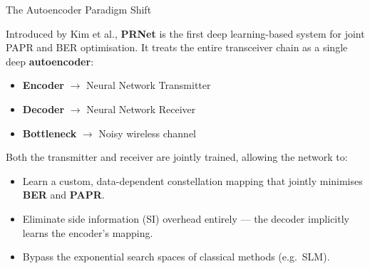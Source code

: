 \documentclass[20pt]{beamer}
\begin{document}
\begin{frame}{The Autoencoder Paradigm Shift}

    \fontsize{14}{18}\selectfont
    Introduced by Kim et al., \textbf{PRNet} is the first deep learning-based system for joint PAPR and BER optimisation. It treats the entire transceiver chain as a single deep \textbf{autoencoder}:
    \begin{itemize}
        \item \textbf{Encoder} $\longrightarrow$ Neural Network Transmitter
        \item \textbf{Decoder} $\longrightarrow$ Neural Network Receiver
        \item \textbf{Bottleneck} $\longrightarrow$ Noisy wireless channel
    \end{itemize}

    {\color{black} Both the transmitter and receiver are jointly trained, allowing the network to:}
    \begin{itemize}
        \item Learn a custom, data-dependent constellation mapping that jointly minimises \textbf{BER} and \textbf{PAPR}.
        \item Eliminate side information (SI) overhead entirely --- the decoder implicitly learns the encoder's mapping.
        \item Bypass the exponential search spaces of classical methods (e.g.\ SLM).
    \end{itemize}

\end{frame}
\end{document}
